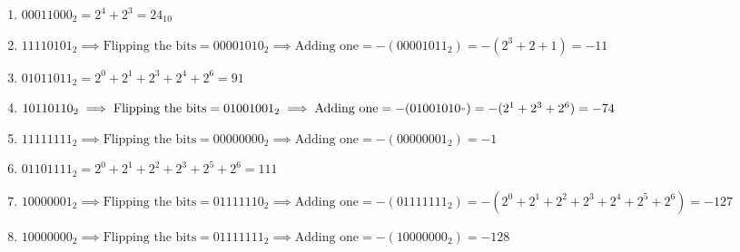 \documentclass[a4paper]{article}
\begin{document}
\begin{enumerate}[label=(\alph*)]
	\item $00011000_2 = 2^4 + 2^3 = 24_{10}$
	\item $11110101_2 \implies \text{Flipping the bits} = 00001010_2 \implies \text{Adding one} = -(00001011_2) = -(2^3 + 2 + 1) = -11$
	\item $01011011_2 = 2^0 + 2^1 + 2^3 + 2^4 + 2^6 = 91$
	\item $10110110_2 \implies \text{Flipping the bits} = 01001001_2 \implies \text{Adding one} = -(01001010_") = - (2^1 + 2^3 + 2^6) = -74$
	\item $11111111_2 \implies \text{Flipping the bits} = 00000000_2 \implies \text{Adding one} = -(00000001_2) = -1$
	\item $01101111_2 = 2^0 + 2^1 + 2^2 + 2^3 + 2^5 + 2^6 = 111$
	\item $10000001_2 \implies \text{Flipping the bits} = 01111110_2 \implies \text{Adding one} = -(01111111_2) = -(2^0 + 2^1 + 2^2 + 2^3 + 2^4 + 2^5 + 2^6) = -127$
	\item $10000000_2 \implies \text{Flipping the bits} = 01111111_2 \implies \text{Adding one} = -(10000000_2) = -128$
\end{enumerate}
\end{document}
